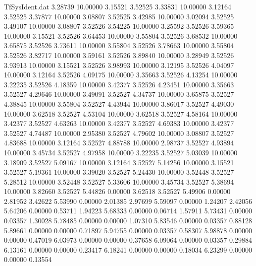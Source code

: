 \begin{filecontents}{TfSysIdent.dat}
   3.28739   10.00000    3.15521    3.52525
   3.33831   10.00000    3.12164    3.52525
   3.37877   10.00000    3.08807    3.52525
   3.42985   10.00000    3.02094    3.52525
   3.49107   10.00000    3.08807    3.52526
   3.54225   10.00000    3.25592    3.52526
   3.59365   10.00000    3.15521    3.52526
   3.64453   10.00000    3.55804    3.52526
   3.68532   10.00000    3.65875    3.52526
   3.73611   10.00000    3.55804    3.52526
   3.78663   10.00000    3.55804    3.52526
   3.82717   10.00000    3.59161    3.52526
   3.89840   10.00000    3.28949    3.52526
   3.93913   10.00000    3.15521    3.52526
   3.98993   10.00000    3.12195    3.52526
   4.04097   10.00000    3.12164    3.52526
   4.09175   10.00000    3.35663    3.52526
   4.13254   10.00000    3.22235    3.52526
   4.18359   10.00000    3.42377    3.52526
   4.23451   10.00000    3.35663    3.52527
   4.29646   10.00000    3.49091    3.52527
   4.34737   10.00000    3.65875    3.52527
   4.38845   10.00000    3.55804    3.52527
   4.43944   10.00000    3.86017    3.52527
   4.49030   10.00000    3.62518    3.52527
   4.53104   10.00000    3.62518    3.52527
   4.58164   10.00000    3.42377    3.52527
   4.63263   10.00000    3.42377    3.52527
   4.69383   10.00000    3.42377    3.52527
   4.74487   10.00000    2.95380    3.52527
   4.79602   10.00000    3.08807    3.52527
   4.83688   10.00000    3.12164    3.52527
   4.88788   10.00000    2.98737    3.52527
   4.93894   10.00000    3.45734    3.52527
   4.97958   10.00000    3.22235    3.52527
   5.03039   10.00000    3.18909    3.52527
   5.09167   10.00000    3.12164    3.52527
   5.14256   10.00000    3.15521    3.52527
   5.19361   10.00000    3.39020    3.52527
   5.24430   10.00000    3.52448    3.52527
   5.28512   10.00000    3.52448    3.52527
   5.33606   10.00000    3.45734    3.52527
   5.38694   10.00000    3.82660    3.52527
   5.44826    0.00000    3.62518    3.52527
   5.49906    0.00000    2.81952    3.42622
   5.53990    0.00000    2.01385    2.97699
   5.59097    0.00000    1.24207    2.42056
   5.64206    0.00000    0.53711    1.94223
   5.68333    0.00000    0.06714    1.57911
   5.73431    0.00000    0.03357    1.30028
   5.78485    0.00000    0.00000    1.07310
   5.83546    0.00000    0.03357    0.88128
   5.89661    0.00000    0.00000    0.71897
   5.94755    0.00000    0.03357    0.58307
   5.98878    0.00000    0.00000    0.47019
   6.03973    0.00000    0.00000    0.37658
   6.09064    0.00000    0.03357    0.29884
   6.13161    0.00000    0.00000    0.23417
   6.18241    0.00000    0.00000    0.18034
   6.23299    0.00000    0.00000    0.13554

\end{filecontents}
